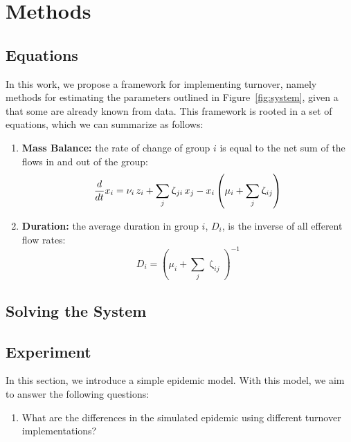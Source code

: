 \documentclass{article}
\numberwithin{equation}{section}
\renewcommand{\zeta}{\upzeta}
\begin{document}
\section{Methods}
\subsection{Equations}
In this work, we propose a framework for implementing turnover,
namely methods for estimating the parameters outlined in Figure~\ref{fig:system},
given a that some are already known from data.
This framework is rooted in a set of equations, which we can summarize as follows:
\begin{enumerate}
  \item \label{sys:mass-balance}\textbf{Mass Balance:}
  the rate of change of group $i$ is equal to the net sum of the flows in and out of the group:
  \begin{equation}\label{eq:mass-balance}
    \frac{d}{dt}x_i
    = \nu_i \thinspace z_i + \sum_{j}{\zeta_{ji} \thinspace x_j}
    - x_i \left( \mu_i + \sum_{j}{\zeta_{ij}} \right)
  \end{equation}
  \item \label{sys:duration}\textbf{Duration:}
  the average duration in group $i$, $D_i$, is the inverse of all efferent flow rates:
  \begin{equation}
    D_i = {\left(\mu_i + \sum_{j}{\zeta_{ij}}\right)}^{-1}
  \end{equation}
\end{enumerate}

\subsection{Solving the System}
\subsection{Experiment}
In this section, we introduce a simple epidemic model.
With this model, we aim to answer the following questions:
\begin{enumerate}
  \item What are the differences in the simulated epidemic using different turnover implementations?
\end{enumerate}
\end{document}
